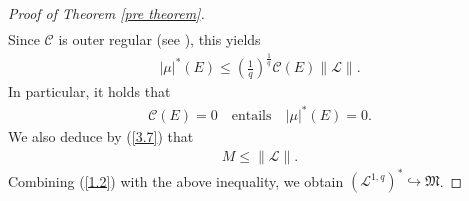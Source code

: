 \documentclass[10pt,reqno]{amsart}
\numberwithin{equation}{section}
\begin{document}
\begin{proof}[Proof of Theorem \ref{pre theorem}]
\begin{align*}
\end{align*}
Since $\mathcal{C}$ is outer regular (see \cite[Proposition 2.3.5]{AH}), this yields
\begin{align}\label{3.7}
|\mu|^{\ast}(E)\leq\left(\frac{1}{q}\right)^{\frac{1}{q}}\mathcal{C}(E)\|\mathcal{L}\|.
\end{align}
In particular, it holds that
\begin{align}\label{3.8}
\mathcal{C}(E)=0\quad\text{entails}\quad|\mu|^{\ast}(E)=0.
\end{align}
We also deduce by (\ref{3.7}) that
\begin{align}\label{second to last}
M\leq\|\mathcal{L}\|.
\end{align}
Combining (\ref{1.2}) with the above inequality, we obtain $(\mathcal{L}^{1,q})^{\ast}\hookrightarrow\mathfrak{M}$.


\end{proof}
\end{document}
